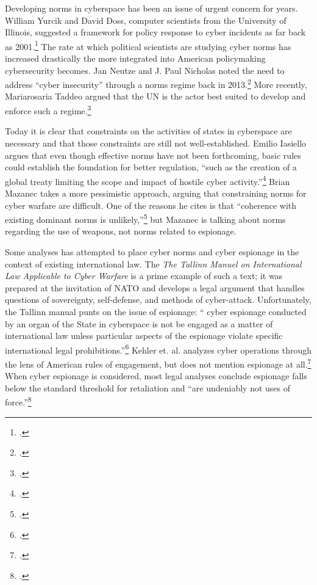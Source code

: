 \documentclass[11pt]{memoir}
\begin{document}
\begin{refsegment}
Developing norms in cyberspace has been an issue of urgent concern for years. William Yurcik and David Doss, computer scientists from the University of Illinois, suggested a framework for policy response to cyber incidents as far back as 2001.\footcite{yurcik_internet_2001} The rate at which political scientists are studying cyber norms has increased drastically the more integrated into American policymaking cybersecurity becomes. Jan Neutze and J. Paul Nicholas noted the need to address ``cyber insecurity'' through a norms regime back in 2013.\footcite{neutze_cyber_2013} More recently, Mariarosaria Taddeo argued that the UN is the actor best suited to develop and enforce such a regime.\footcite{taddeo_deterrence_2017}

Today it is clear that constraints on the activities of states in cyberspace are necessary and that those constraints are still not well-established. Emilio Iasiello argues that even though effective norms have not been forthcoming, basic rules could establish the foundation for better regulation, ``such as the creation of a global treaty limiting the scope and impact of hostile cyber activity.''\footcite[p.~35]{iasiello_what_2016} Brian Mazanec takes a more pessimistic approach, arguing that constraining norms for cyber warfare are difficult. One of the reasons he cites is that ``coherence with existing dominant norms is unlikely,''\footcite[p.~104-105]{mazanec_constraining_2016} but Mazanec is talking about norms regarding the use of weapons, not norms related to espionage.

Some analyses has attempted to place cyber norms and cyber espionage in the context of existing international law. The \emph{The Tallinn Manuel on International Law Applicable to Cyber Warfare} is a prime example of such a text; it was prepared at the invitation of NATO and develops a legal argument that handles questions of sovereignty, self-defense, and methods of cyber-attack. Unfortunately, the Tallinn manual punts on the issue of espionage: ``\textelp{} cyber espionage conducted by an organ of the State in cyberspace is not be engaged as a matter of international law unless particular aspects of the espionage violate specific international legal prohibitions.''\footcite[p.~36]{schmitt_tallinn_2013} Kehler et. al. analyzes cyber operations through the lens of American rules of engagement, but does not mention espionage at all.\footcite{kehler_rules_2017} When cyber espionage is considered, most legal analyses conclude espionage falls below the standard threshold for retaliation and ``are undeniably not uses of force.''\footcite[p.~255]{caso_rules_2014}


\end{refsegment}
\end{document}
